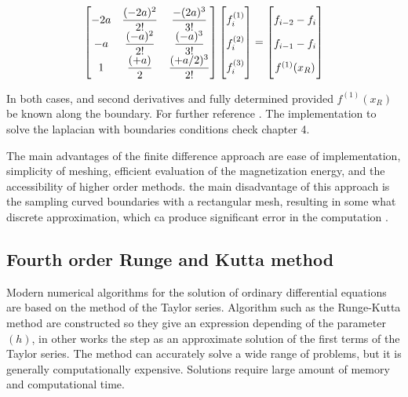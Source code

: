 \begin{align} \label{eq:matrix3}
\begin{bmatrix}
    -2a & \dfrac{(-2a)^2}{2!} & \dfrac{-(2a)^3}{3!}\\
    -a & \dfrac{(-a)^2}{2!} & \dfrac{(-a)^3}{3!}\\
    1 & \dfrac{(+a)}{2} & \dfrac{(+a/2)^3}{2!}
\end{bmatrix}
\begin{bmatrix}
    f_i^{(1)}  \vphantom{ \dfrac{d^4}{d} }\\
    f_i^{(2)}  \vphantom{ \dfrac{d^4}{d} } \\
    f_i^{(3)}  \vphantom{ \dfrac{d^4}{d} }
\end{bmatrix}
=
\begin{bmatrix}
    f_{i-2} - f_{i}    \vphantom{ \dfrac{d^4}{d}} \\
    f_{i-1} - f_{i}    \vphantom{ \dfrac{d^4}{d}} \\
    f^{(1)}(x_R)   \vphantom{ \dfrac{d^4}{d}}
\end{bmatrix}
\end{align}

In both cases, and second derivatives and fully determined provided $f^{(1)}(x_R)$ be known along the boundary. For further reference \cite{methods}. The implementation to solve the laplacian with boundaries conditions check chapter 4.

The main advantages of the finite difference approach are ease of implementation, simplicity of meshing, efficient evaluation of the magnetization energy, and the accessibility of higher order methods. the main disadvantage of this approach is the sampling curved boundaries with a rectangular mesh, resulting in some what discrete  approximation, which ca produce significant error in the computation .

\subsection{Fourth order Runge and Kutta method}

 Modern numerical algorithms for the solution of ordinary differential equations are based on the method of the Taylor series. Algorithm such as the Runge-Kutta method are constructed so they give an expression depending of the parameter $(h)$, in other works the step as an approximate solution of the first terms of the Taylor series. \cite{ufdtd}
The method can accurately solve a wide range of problems, but it is generally computationally expensive. Solutions require large amount of memory and computational time.

